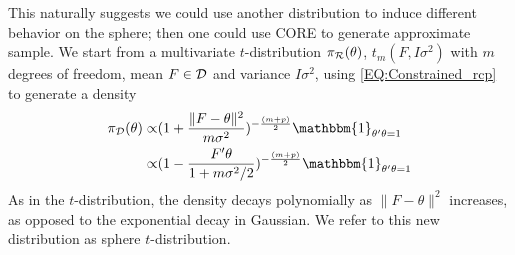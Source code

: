 \documentclass[10pt,fleqn]{article} \pdfoutput=1
\newcommand{\be}{\begin{equation}\begin{aligned}}
\newcommand{\ee}{\end{aligned}\end{equation}}
\DeclareMathOperator{\1}{\mathbbm{1}} \DeclareMathOperator{\bigO}{\mc O}
\begin{document}
This naturally suggests we could use another distribution to induce different behavior on the sphere; then one could use CORE to generate approximate sample. We start from a
multivariate $t$-distribution $\pi_{\mathcal{R}}(\theta)$, $t_m(F,I\sigma^2)$ with $m$ degrees of freedom,
mean $F\in \mathcal{D}$ and variance $I\sigma^2$, using \eqref{EQ:Constrained_rcp} to generate a density 
\be
\pi_{\mc
D}(\theta)
\propto &
(1+\frac{\|F-\theta\|^2}{m\sigma^2})^{-\frac{(m+p)}{2}}\mathbbm{1}_{\theta'\theta=1}\\
\propto &
(1-\frac{F'\theta}{1+m\sigma^2/2})^{-\frac{(m+p)}{2}}\mathbbm{1}_{\theta'\theta=1}
\ee
As in the $t$-distribution, the density decays polynomially as $\|F-\theta\|^2$ increases, as opposed to the exponential decay in Gaussian. We refer to this new distribution as sphere $t$-distribution.
\end{document}
